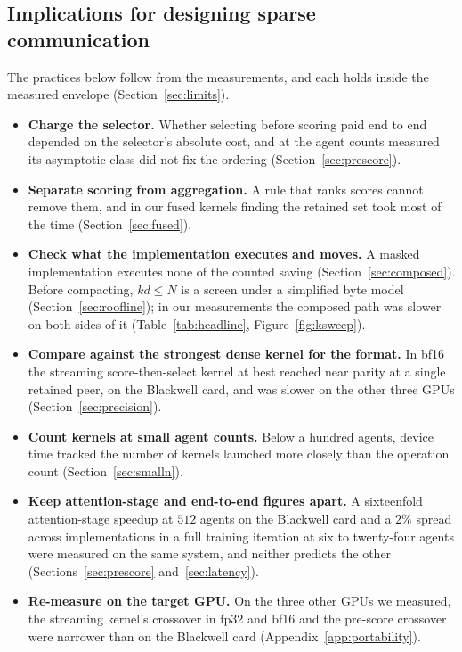 \subsection{Implications for designing sparse communication}
\label{sec:takeaways}

The practices below follow from the measurements, and each holds inside the measured envelope
(Section~\ref{sec:limits}).

\begin{itemize}
  \item \textbf{Charge the selector.} Whether selecting before scoring paid end
    to end depended on the selector's absolute cost, and at the agent counts
    measured its asymptotic class did not fix the ordering
    (Section~\ref{sec:prescore}).
  \item \textbf{Separate scoring from aggregation.} A rule that ranks scores
    cannot remove them, and in our fused kernels finding the retained set took
    most of the time (Section~\ref{sec:fused}).
  \item \textbf{Check what the implementation executes and moves.} A masked
    implementation executes none of the counted saving
    (Section~\ref{sec:composed}). Before compacting, $kd \le N$ is a screen under
    a simplified byte model (Section~\ref{sec:roofline}); in our measurements the
    composed path was slower on both sides of it (Table~\ref{tab:headline},
    Figure~\ref{fig:ksweep}).
  \item \textbf{Compare against the strongest dense kernel for the format.} In
    bf16 the streaming score-then-select kernel at best reached near parity at a
    single retained peer, on the Blackwell card, and was slower on the other
    three GPUs
    (Section~\ref{sec:precision}).
  \item \textbf{Count kernels at small agent counts.} Below a hundred agents,
    device time tracked the number of kernels launched more closely than the
    operation count (Section~\ref{sec:smalln}).
  \item \textbf{Keep attention-stage and end-to-end figures apart.} A sixteenfold
    attention-stage speedup at $512$ agents on the Blackwell card and a $2\%$
    spread across implementations in a full training iteration at six to
    twenty-four agents were measured on the same system, and neither predicts
    the other
    (Sections~\ref{sec:prescore} and~\ref{sec:latency}).
  \item \textbf{Re-measure on the target GPU.} On the three other GPUs we
    measured, the streaming kernel's crossover in fp32 and bf16 and the
    pre-score crossover were narrower than on the Blackwell card
    (Appendix~\ref{app:portability}).
\end{itemize}

